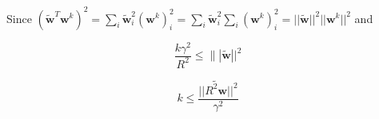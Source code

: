\documentclass[12pt]{article}
\begin{document}
Since $\left( \widetilde{\mathbf{w}}^T \mathbf{w}^k \right)^2 = \sum_i \widetilde{\mathbf{w}}_i^2 (\mathbf{w}^k)_i^2 = \sum_i \widetilde{\mathbf{w}}_i^2 \sum_i (\mathbf{w}^k)_i^2 = ||\widetilde{\mathbf{w}}||^2 ||\mathbf{w}^k||^2$ and

\begin{equation}
 \frac{k \gamma^2}{R^2} \leq \||\widetilde{\mathbf{w}}||^2
\end{equation}

\begin{equation}
 k \leq \frac{||\widetilde{R^2 \mathbf{w}}||^2}{\gamma^2}
\end{equation}


  
\end{document}
